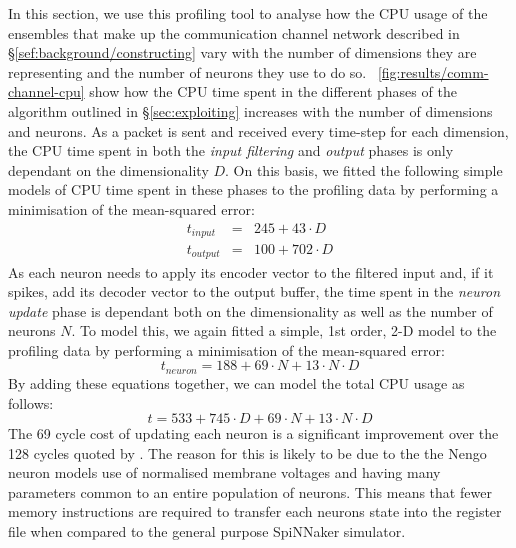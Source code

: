 \documentclass[conference]{IEEEtran}
\begin{document}
In this section, we use this profiling tool to analyse how the CPU usage of the ensembles that make up the communication channel network described in \S\ref{sef:background/constructing} vary with the number of dimensions they are representing and the number of neurons they use to do so. 
\figurename~\ref{fig:results/comm-channel-cpu} show how the CPU time spent in the different phases of the algorithm outlined in \S\ref{sec:exploiting} increases with the number of dimensions and neurons. 
As a packet is sent and received every time-step for each dimension, the CPU time spent in both the \textit{input filtering} and \textit{output} phases is only dependant on the dimensionality $D$. On this basis, we fitted the following simple models of CPU time spent in these phases to the profiling data by performing a minimisation of the mean-squared error:
%
\begin{eqnarray}
  t_{input} & = & 245 + 43 \cdot D \label{eq:profiling_input}\\
  t_{output} & = & 100 + 702 \cdot D \label{eq:profiling_output}
\end{eqnarray}
%
As each neuron needs to apply its encoder vector to the filtered input and, if it spikes, add its decoder vector to the output buffer, the time spent in the \textit{neuron update} phase is dependant both on the dimensionality as well as the number of neurons $N$. To model this, we again fitted a simple, 1st order, 2-D model to the profiling data by performing a minimisation of the mean-squared error:
%
\begin{equation}
  t_{neuron} = 188 + 69 \cdot N + 13 \cdot N \cdot D\label{eq:profiling_neuron}
\end{equation}
%
By adding these equations together, we can model the total CPU usage as follows:
%
\begin{equation}
  t = 533 + 745 \cdot D + 69 \cdot N + 13 \cdot N \cdot D\label{eq:profiling_total}
\end{equation}
%
The 69 cycle cost of updating each neuron is a significant improvement over the 128 cycles quoted by \textcite{Sharp2013}. 
The reason for this is likely to be due to the the Nengo neuron models use of normalised membrane voltages and having many parameters common to an entire population of neurons. 
This means that fewer memory instructions are required to transfer each neurons state into the register file when compared to the general purpose SpiNNaker simulator. 
\end{document}
